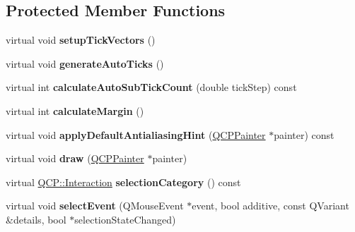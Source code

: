 \subsection*{Protected Member Functions}
\begin{DoxyCompactItemize}
\item 
\mbox{\label{class_q_c_p_axis_a57d9e961bae7d62f5b4e1f143e660c78}} 
virtual void {\bfseries setup\+Tick\+Vectors} ()
\item 
\mbox{\label{class_q_c_p_axis_a626eef437c874148df1a5ac78506d463}} 
virtual void {\bfseries generate\+Auto\+Ticks} ()
\item 
\mbox{\label{class_q_c_p_axis_aca96dda6dbd08b062fc96e34df16c68a}} 
virtual int {\bfseries calculate\+Auto\+Sub\+Tick\+Count} (double tick\+Step) const
\item 
\mbox{\label{class_q_c_p_axis_a47bdb0a55de6759489ee47665199aebb}} 
virtual int {\bfseries calculate\+Margin} ()
\item 
\mbox{\label{class_q_c_p_axis_a427f3de3369a8691ffece384437f0c7a}} 
virtual void {\bfseries apply\+Default\+Antialiasing\+Hint} (\mbox{\hyperlink{class_q_c_p_painter}{Q\+C\+P\+Painter}} $\ast$painter) const
\item 
\mbox{\label{class_q_c_p_axis_a258b1e783eda5cd14ec5552c696a424e}} 
virtual void {\bfseries draw} (\mbox{\hyperlink{class_q_c_p_painter}{Q\+C\+P\+Painter}} $\ast$painter)
\item 
\mbox{\label{class_q_c_p_axis_a04b897f3e24724b8f021639b220fd71c}} 
virtual \mbox{\hyperlink{namespace_q_c_p_a2ad6bb6281c7c2d593d4277b44c2b037}{Q\+C\+P\+::\+Interaction}} {\bfseries selection\+Category} () const
\item 
\mbox{\label{class_q_c_p_axis_aa8a5fe80e2898ec08ada26b5fbee9eca}} 
virtual void {\bfseries select\+Event} (Q\+Mouse\+Event $\ast$event, bool additive, const Q\+Variant \&details, bool $\ast$selection\+State\+Changed)
\item 
\mbox{\label{class_q_c_p_axis_a53512242cde6ec21943a3ba10dbf78c3}} 

\end{DoxyCompactItemize}
